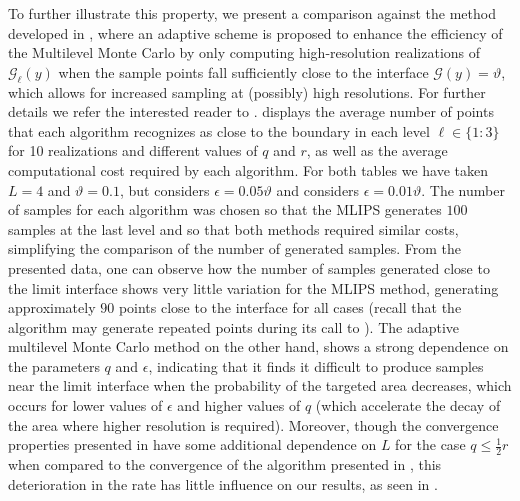 \documentclass{article}
\newcommand{\cG}{\mathcal{G}}
\theoremstyle{definition}
\begin{document}
To further illustrate this property, we present a comparison against the method developed in \cite{elfversonMultilevelMonteCarlo2016}, where an adaptive scheme is proposed to enhance the efficiency of the Multilevel Monte Carlo by only computing high-resolution realizations of $\cG_\ell(y)$ when the sample points fall sufficiently close to the interface $\cG(y)=\vartheta$, which allows for increased sampling at (possibly) high resolutions. For further details we refer the interested reader to \cite{elfversonMultilevelMonteCarlo2016}.  displays the average number of points that each algorithm recognizes as close to the boundary in each level $\ell\in\{1:3\}$ for 10 realizations and different values of $q$ and $r$, as well as the average computational cost required by each algorithm. For both tables we have taken $L=4$ and $\vartheta=0.1$, but  considers $\epsilon=0.05\vartheta$ and  considers $\epsilon=0.01\vartheta$. The number of samples for each algorithm was chosen so that the MLIPS generates $100$ samples at the last level and so that both methods required similar costs, simplifying the comparison of the number of generated samples. From the presented data, one can observe how the number of samples generated close to the limit interface shows very little variation for the MLIPS method, generating approximately $90$ points close to the interface for all cases (recall that the algorithm may generate repeated points during its call to ). The adaptive multilevel Monte Carlo method on the other hand, shows a strong dependence on the parameters $q$ and $\epsilon$, indicating that it finds it difficult to produce samples near the limit interface when the probability of the targeted area decreases, which occurs for lower values of $\epsilon$ and higher values of $q$ (which accelerate the decay of the area where higher resolution is required). Moreover, though the convergence properties presented in  have some additional dependence on $L$ for the case $q\leq \frac{1}{2}r$ when compared to the convergence of the algorithm presented in \cite{elfversonMultilevelMonteCarlo2016}, this deterioration in the rate has little influence on our results, as seen in .
\end{document}
